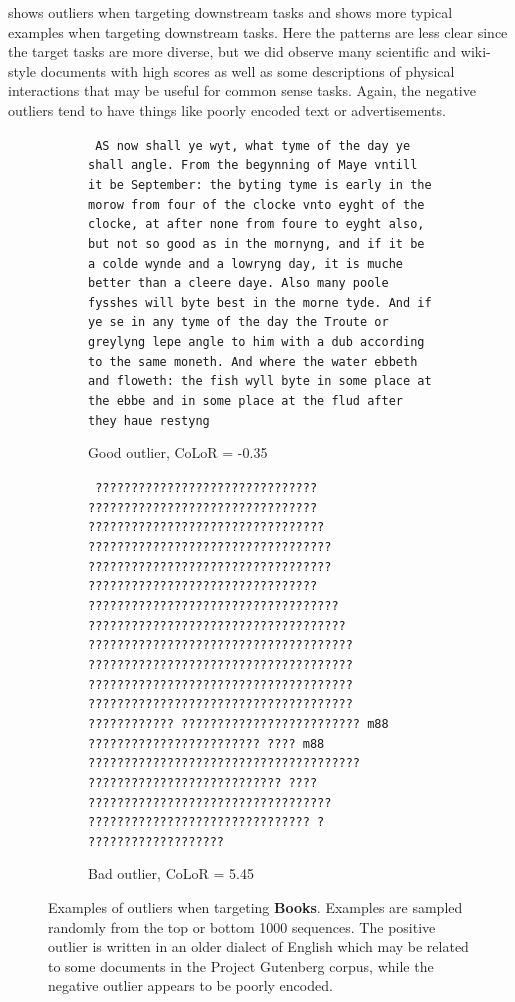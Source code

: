 \documentclass{article}
\begin{document}
 shows outliers when targeting downstream tasks and  shows more typical examples when targeting downstream tasks. Here the patterns are less clear since the target tasks are more diverse, but we did observe many scientific and wiki-style documents with high scores as well as some descriptions of physical interactions that may be useful for common sense tasks. Again, the negative outliers tend to have things like poorly encoded text or advertisements. 

\begin{figure}[h]
    \begin{subfigure}[b]{0.45\textwidth}
        \centering
        {\small
        \texttt{
AS now shall ye wyt, what tyme of the day ye shall angle. From the begynning of Maye vntill it be September: the byting tyme is early in the morow from four of the clocke vnto eyght of the clocke, at after none from foure to eyght also, but not so good as in the mornyng, and if it be a colde wynde and a lowryng day, it is muche better than a cleere daye. Also many poole fysshes will byte best in the morne tyde.
And if ye se in any tyme of the day the Troute or greylyng lepe angle to him with a dub according to the same moneth. And where the water ebbeth and floweth: the fish wyll byte in some place at the ebbe and in some place at the flud after they haue restyng}}
        \caption{Good outlier, CoLoR = -0.35}
    \end{subfigure}
    \hfill
        \begin{subfigure}[b]{0.45\textwidth}
        \centering
        {\small
\texttt{
??????????????????????????????? ???????????????????????????????? ?????????????????????????????????
??????????????????????????????????
??????????????????????????????????
???????????????????????????????? ???????????????????????????????????
????????????????????????????????????
?????????????????????????????????????
?????????????????????????????????????
?????????????????????????????????????
?????????????????????????????????????
???????????? ????????????????????????? m88 ???????????????????????? ???? m88 ??????????????????????????????????????
??????????????????????????? ???? ?????????????????????????????????? ??????????????????????????????? ? ???????????????????
}}
        \caption{Bad outlier, CoLoR = 5.45}
    \end{subfigure}
    \caption{Examples of outliers when targeting \textbf{Books}. Examples are sampled randomly from the top or bottom 1000 sequences. The positive outlier is written in an older dialect of English which may be related to some documents in the Project Gutenberg corpus, while the negative outlier appears to be poorly encoded.}
    \label{fig:books_outliers}
\end{figure}
\end{document}
